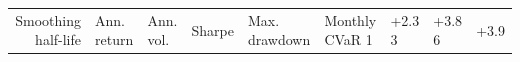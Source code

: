\begin{tabular}{rlllllll}
\toprule
Smoothing half-life & Ann. return & Ann. vol. & Sharpe & Max. drawdown & Monthly CVaR 1%
 & +2.3%
3 & +3.8%
6 & +3.9%
\bottomrule
\end{tabular}
